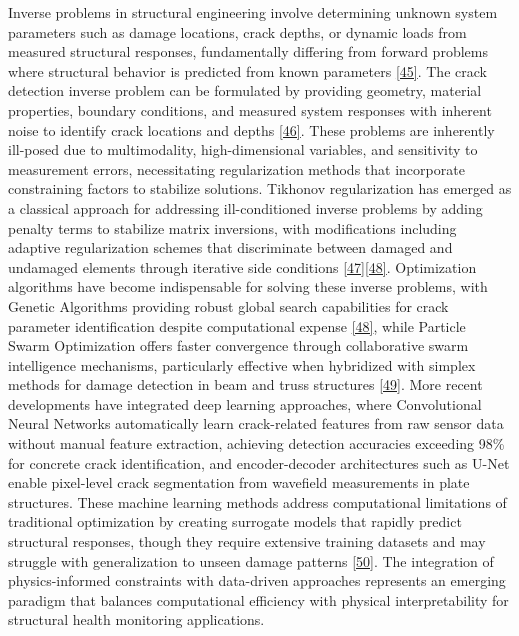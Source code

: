 \documentclass[12pt,a4paper]{report}
\begin{document}
Inverse problems in structural engineering involve determining unknown system parameters such as damage locations, crack depths, or dynamic loads from measured structural responses, fundamentally differing from forward problems where structural behavior is predicted from known parameters \href{https://www.tandfonline.com/doi/full/10.1080/17415970500272908}{[45]}. The crack detection inverse problem can be formulated by providing geometry, material properties, boundary conditions, and measured system responses with inherent noise to identify crack locations and depths \href{https://www.researchgate.net/publication/239403302_Inverse_and_Crack_Identification_Problems_in_Engineering_Mechanics}{[46]}. These problems are inherently ill-posed due to multimodality, high-dimensional variables, and sensitivity to measurement errors, necessitating regularization methods that incorporate constraining factors to stabilize solutions. Tikhonov regularization has emerged as a classical approach for addressing ill-conditioned inverse problems by adding penalty terms to stabilize matrix inversions, with modifications including adaptive regularization schemes that discriminate between damaged and undamaged elements through iterative side conditions \href{https://www.sciencedirect.com/science/article/pii/S088832701000052X}{[47]}\href{https://onlinelibrary.wiley.com/doi/10.1002/cnm.541}{[48]}. Optimization algorithms have become indispensable for solving these inverse problems, with Genetic Algorithms providing robust global search capabilities for crack parameter identification despite computational expense \href{https://www.sciencedirect.com/science/article/pii/S1568494607001020}{[48]}, while Particle Swarm Optimization offers faster convergence through collaborative swarm intelligence mechanisms, particularly effective when hybridized with simplex methods for damage detection in beam and truss structures \href{https://www.sciencedirect.com/science/article/pii/S0965997809000040}{[49]}. More recent developments have integrated deep learning approaches, where Convolutional Neural Networks automatically learn crack-related features from raw sensor data without manual feature extraction, achieving detection accuracies exceeding 98\% for concrete crack identification, and encoder-decoder architectures such as U-Net enable pixel-level crack segmentation from wavefield measurements in plate structures. These machine learning methods address computational limitations of traditional optimization by creating surrogate models that rapidly predict structural responses, though they require extensive training datasets and may struggle with generalization to unseen damage patterns \href{https://www.nature.com/articles/s41467-024-52501-4}{[50]}. The integration of physics-informed constraints with data-driven approaches represents an emerging paradigm that balances computational efficiency with physical interpretability for structural health monitoring applications.
\end{document}
